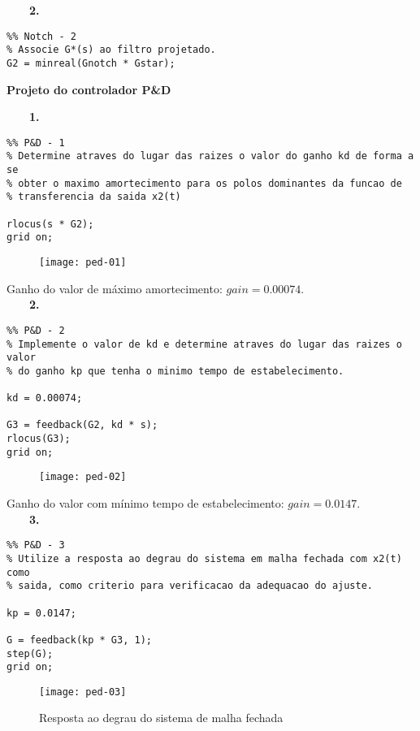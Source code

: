 \documentclass[a4paper,11pt]{article}
\begin{document}
~~~~\textbf{2.}

\begin{lstlisting}
%% Notch - 2
% Associe G*(s) ao filtro projetado.
G2 = minreal(Gnotch * Gstar);
\end{lstlisting}

\pagebreak

\textbf{Projeto do controlador P\&D}

~~~~\textbf{1.}

\begin{lstlisting}
%% P&D - 1
% Determine atraves do lugar das raizes o valor do ganho kd de forma a se
% obter o maximo amortecimento para os polos dominantes da funcao de
% transferencia da saida x2(t)

rlocus(s * G2);
grid on;
\end{lstlisting}

\begin{figure}[H]
\centering
\texttt{[image: ped-01]}
\end{figure}

Ganho do valor de máximo amortecimento: $gain = 0.00074$. \\

~~~~\textbf{2.}

\begin{lstlisting}
%% P&D - 2
% Implemente o valor de kd e determine atraves do lugar das raizes o valor
% do ganho kp que tenha o minimo tempo de estabelecimento.

kd = 0.00074;

G3 = feedback(G2, kd * s);
rlocus(G3);
grid on;
\end{lstlisting}

\begin{figure}[H]
\centering
\texttt{[image: ped-02]}
\end{figure}

Ganho do valor com mínimo tempo de estabelecimento: $gain = 0.0147$. \\

~~~~\textbf{3.}

\begin{lstlisting}
%% P&D - 3
% Utilize a resposta ao degrau do sistema em malha fechada com x2(t) como
% saida, como criterio para verificacao da adequacao do ajuste.

kp = 0.0147;

G = feedback(kp * G3, 1);
step(G);
grid on;
\end{lstlisting}

\begin{figure}[H]
\centering
\texttt{[image: ped-03]}
\caption{Resposta ao degrau do sistema de malha fechada}
\end{figure}
\end{document}
